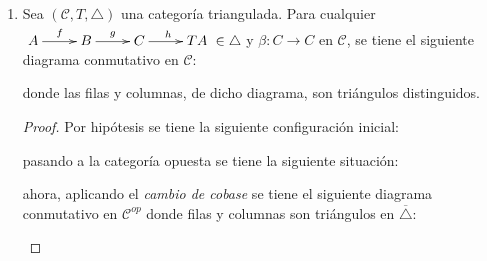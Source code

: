 \documentclass{article}
\newcommand{\cc}{\mathscr{C}}
\begin{document}
\begin{enumerate}

\item Sea $(\cc,T,\triangle)$ una categor\'ia triangulada. Para cualquier $\xymatrix{A\ar[r]^f & B\ar[r]^g & C\ar[r]^h & TA }\in \triangle$ y $\beta:C\to C$ en $\cc$, se tiene el siguiente diagrama conmutativo en $\cc$:

\begin{center}
\end{center}
donde las filas y columnas, de dicho diagrama, son triángulos distinguidos.

\begin{proof}
Por hipótesis se tiene la siguiente configuración inicial:

\begin{center}
\end{center}

pasando a la categoría opuesta se tiene la siguiente situación:

\begin{center}
\end{center}

ahora, aplicando el \emph{cambio de cobase} se tiene el siguiente diagrama conmutativo en $\cc^{op}$ donde filas y columnas son triángulos en $\overline{\triangle}$:

\begin{center}
\end{center}


\end{proof}
\end{enumerate}
\end{document}
